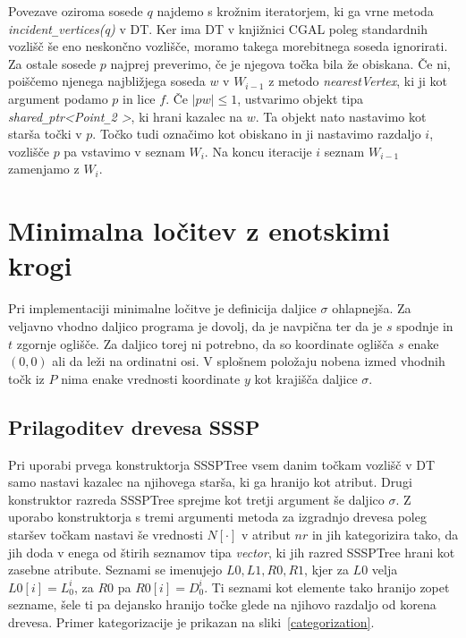 \documentclass[a4paper, 12pt]{book}
\newcommand{\U}{\texttt{\_}}
\begin{document}
Povezave oziroma sosede $q$ najdemo s krožnim iteratorjem, ki ga vrne metoda \textit{incident\U vertices(q)} v DT. Ker ima DT v knjižnici CGAL poleg standardnih vozlišč še eno neskončno vozlišče, moramo takega morebitnega soseda ignorirati. Za ostale sosede $p$ najprej preverimo, če je njegova točka bila že obiskana. Če ni, poiščemo njenega najbližjega soseda $w$ v $W_{i-1}$ z metodo \textit{nearestVertex}, ki ji kot argument podamo $p$ in lice $f$. Če $|pw|\le 1$, ustvarimo objekt tipa \textit{shared\U ptr\textless Point\U 2 \textgreater}, ki hrani kazalec na $w$. Ta objekt nato nastavimo kot starša točki v $p$. Točko tudi označimo kot obiskano in ji nastavimo razdaljo $i$, vozlišče $p$ pa vstavimo v seznam $W_i$. Na koncu iteracije $i$ seznam $W_{i-1}$ zamenjamo z $W_i$.

\section{Minimalna ločitev z enotskimi krogi}
Pri implementaciji minimalne ločitve je definicija daljice $\sigma$ ohlapnejša. Za veljavno vhodno daljico programa je dovolj, da je navpična ter da je $s$ spodnje in $t$ zgornje oglišče. Za daljico torej ni potrebno, da so koordinate oglišča $s$ enake $(0, 0)$ ali da leži na ordinatni osi. V splošnem položaju nobena izmed vhodnih točk iz $P$ nima enake vrednosti koordinate $y$ kot krajišča daljice $\sigma$.
\subsection{Prilagoditev drevesa SSSP}

Pri uporabi prvega konstruktorja SSSPTree vsem danim točkam vozlišč v DT samo nastavi kazalec na njihovega starša, ki ga hranijo kot atribut. Drugi konstruktor razreda SSSPTree sprejme kot tretji argument še daljico $\sigma$. Z uporabo konstruktorja s tremi argumenti metoda za izgradnjo drevesa poleg staršev točkam nastavi še vrednosti $N[\cdot]$ v atribut $nr$ in jih kategorizira tako, da jih doda v enega od štirih seznamov tipa \textit{vector}, ki jih razred SSSPTree hrani kot zasebne atribute. Seznami se imenujejo $L0, L1, R0, R1$, kjer za $L0$ velja $L0[i] = L_0^i$, za $R0$ pa $R0[i] = D_0^i$. Ti seznami kot elemente tako hranijo zopet sezname, šele ti pa dejansko hranijo točke glede na njihovo razdaljo od korena drevesa. Primer kategorizacije je prikazan na sliki~\ref{categorization}.
\end{document}
